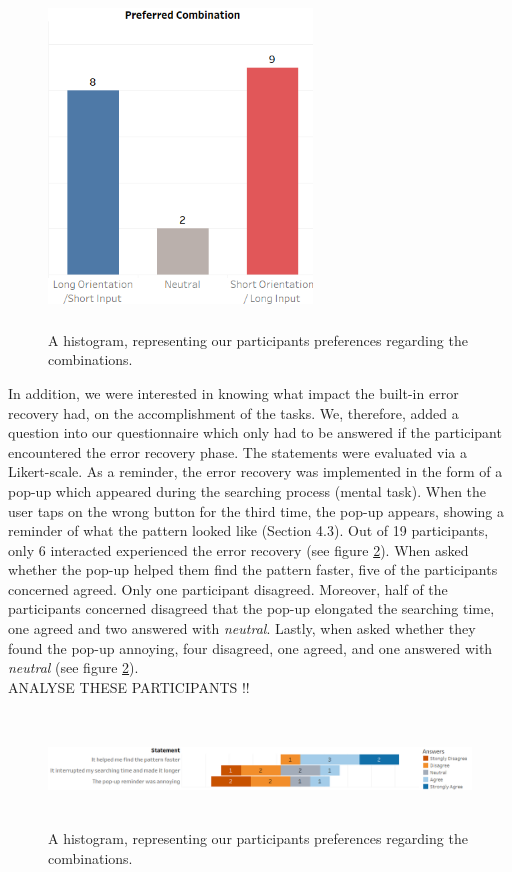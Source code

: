 \begin{figure}[t!]
\centering
\includegraphics[width=7cm, height=9cm]{Chapters/graphics/preference.png}
\caption{A histogram, representing our participants preferences regarding the combinations.}
\label{fig:preference}
\end{figure}

In addition, we were interested in knowing what impact the built-in error recovery had, on the accomplishment of the tasks. We, therefore, added a question into our questionnaire which only had to be answered if the participant encountered the error recovery phase. The statements were evaluated via a Likert-scale. As a reminder, the error recovery was implemented in the form of a pop-up which appeared during the searching process (mental task). When the user taps on the wrong button for the third time, the pop-up appears, showing a reminder of what the pattern looked like (Section 4.3). Out of 19 participants, only 6 interacted experienced the error recovery (see figure \ref{fig:error}). When asked whether the pop-up helped them find the pattern faster, five of the participants concerned agreed. Only one participant disagreed. Moreover, half of the participants concerned disagreed that the pop-up elongated the searching time, one agreed and two answered with \textit{neutral}. Lastly, when asked whether they found the pop-up annoying, four disagreed, one agreed, and one answered with \textit{neutral} (see figure \ref{fig:error}). \\

ANALYSE THESE PARTICIPANTS !! 


\begin{figure}[t!]
\centering
\includegraphics[width=15cm, height=3cm]{Chapters/graphics/ErrorRecovery.png}
\caption{A histogram, representing our participants preferences regarding the combinations.}
\label{fig:error}
\end{figure}





